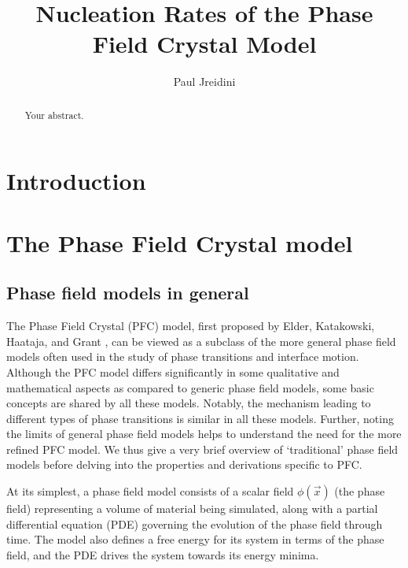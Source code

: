 \documentclass[a4paper]{article}
\title{Nucleation Rates of the Phase Field Crystal Model}
\author{Paul Jreidini}
\begin{document}
\maketitle

\begin{abstract}
Your abstract.
\end{abstract}

\tableofcontents

\section{Introduction}\label{sec:intro}

\section{The Phase Field Crystal model}\label{sec:pfc}

\subsection{Phase field models in general}\label{subsec:pfc_phasefield}

The Phase Field Crystal (PFC) model, first proposed by Elder, Katakowski, Haataja, and Grant \cite{elder02}, can be viewed as a subclass of the more general phase field models often used in the study of phase transitions and interface motion. Although the PFC model differs significantly in some qualitative and mathematical aspects as compared to generic phase field models, some basic concepts are shared by all these models. Notably, the mechanism leading to different types of phase transitions is similar in all these models. Further, noting the limits of general phase field models helps to understand the need for the more refined PFC model. We thus give a very brief overview of `traditional' phase field models before delving into the properties and derivations specific to PFC.

At its simplest, a phase field model consists of a scalar field $\phi(\vec{x})$ (the phase field) representing a volume of material being simulated, along with a partial differential equation (PDE) governing the evolution of the phase field through time. The model also defines a free energy for its system in terms of the phase field, and the PDE drives the system towards its energy minima.
\end{document}
